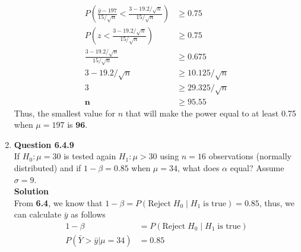 \documentclass{uofa-eng-assignment}
\begin{document}
\begin{enumerate}
\begin{align*}
            P(\frac{\bar{y} - 197}{15 / \sqrt{n}} < \frac{3 - 19.2/\sqrt{n}}{15 / \sqrt{n}})  & \geq 0.75               \\
            P(z < \frac{3 - 19.2/\sqrt{n}}{15 / \sqrt{n}})                                    & \geq 0.75               \\
            \frac{3 - 19.2/\sqrt{n}}{15 / \sqrt{n}}                                           & \geq 0.675              \\
            3 - 19.2/\sqrt{n}                                                                 & \geq 10.125/\sqrt{n}    \\
            3                                                                                 & \geq 29.325/\sqrt{n}    \\
            \boldsymbol{n}                                                                    & \boldsymbol{\geq 95.55}
        \end{align*}
        Thus, the smallest value for $n$ that will make the power equal to at least 0.75 when $\mu = 197$ is $\boldsymbol{96}$.
    \item[]
        \textbf{Question 6.4.9} \\
        If $H_0:\mu=30$ is tested again $H_1:\mu > 30$ using $n=16$ observations (normally distributed)
        and if $1 - \beta = 0.85$ when $\mu = 34$, what does $\alpha$ equal? Assume $\sigma = 9$. \\
        \textbf{Solution} \\
        From \textbf{6.4}, we know that $1 - \beta = P(\text{Reject}\;H_0\;|\;H_1\;\text{is true}) = 0.85$,
        thus, we can calculate $\bar{y}$ as follows
        \begin{align*}
            1 - \beta                                    & = P(\text{Reject}\;H_0\;|\;H_1\;\text{is true}) \\
            P(\bar{Y} > \bar{y} | \mu = 34)              & = 0.85                                          \\

\end{align*}
\end{enumerate}
\end{document}
